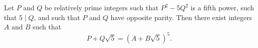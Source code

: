 Let $P$ and $Q$ be relatively prime integers such that $P^2 - 5Q^2$ is a fifth power, such that $5 \mid Q$, and such that $P$ and $Q$ have opposite parity. Then there exist integers $A$ and $B$ such that
$$P + Q\sqrt{5} = (A + B\sqrt{5})^5.$$
